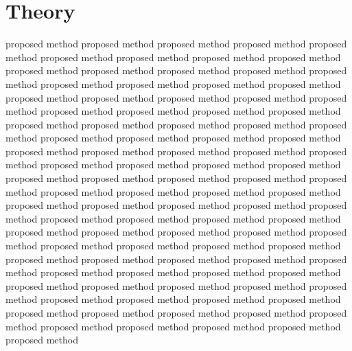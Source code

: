 \documentclass[platex,ja=standard,12pt,a4paper,twoside,onecolumn,fleqn,dvipdfmx,english]{bxjsbook}
\begin{document}
\chapter{Theory}
proposed method proposed method proposed method proposed method proposed method proposed method proposed method proposed method proposed method proposed method proposed method proposed method proposed method proposed method proposed method proposed method proposed method proposed method proposed method proposed method proposed method proposed method proposed method proposed method proposed method proposed method proposed method proposed method proposed method proposed method proposed method proposed method proposed method proposed method proposed method proposed method proposed method proposed method proposed method proposed method proposed method proposed method proposed method proposed method proposed method proposed method proposed method proposed method proposed method proposed method proposed method proposed method proposed method proposed method proposed method proposed method proposed method proposed method proposed method proposed method proposed method proposed method proposed method proposed method proposed method proposed method proposed method proposed method proposed method proposed method proposed method proposed method proposed method proposed method proposed method proposed method proposed method proposed method proposed method proposed method proposed method proposed method proposed method proposed method proposed method proposed method proposed method proposed method proposed method proposed method proposed method proposed method proposed method proposed method proposed method proposed method proposed method proposed method proposed method proposed method
\end{document}
